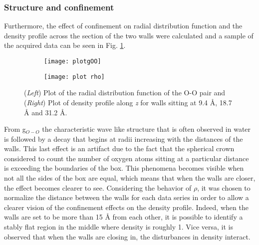 \documentclass[
	12pt, %
]{fphw}
\begin{document}
\subsubsection{Structure and confinement}
Furthermore, the effect of confinement on radial distribution function and the density profile across the section of the two walls were calculated and a sample of the acquired data can be seen in Fig. \ref{g-rho}.
\begin{figure}[h!]
	\centering
	\begin{subfigure}{0.4\textwidth}
		\texttt{[image: plotgOO]}
	\end{subfigure}
	\begin{subfigure}{0.4\textwidth}
		\texttt{[image: plot rho]}
	\end{subfigure}	
	\caption{(\textit{Left}) Plot of the radial distribution function of the O-O pair and (\textit{Right}) Plot of density profile along \textit{z} for walls sitting at 9.4 \r{A}, 18.7 \r{A} and 31.2 \r{A}.}
	\label{g-rho}
\end{figure}
From g$_{O-O}$ the characteristic wave like structure that is often observed in water is followed by a decay that begins at radii increasing with the distances of the walls.
This last effect is an artifact due to the fact that the spherical crown considered to count the number of oxygen atoms sitting at a particular distance is exceeding the boundaries of the box.
This phenomena becomes visible when not all the sides of the box are equal, which means that when the walls are closer, the effect becomes clearer to see.
\medskip
Considering the behavior of $\rho$, it was chosen to normalize the distance between the walls for each data series in order to allow a clearer vision of the confinement effects on the density profile.
Indeed, when the walls are set to be more than 15 \r{A} from each other, it is possible to identify a stably flat region in the middle where density is roughly 1.
Vice versa, it is observed that when the walls are closing in, the disturbances in density interact.
\medskip
\end{document}
